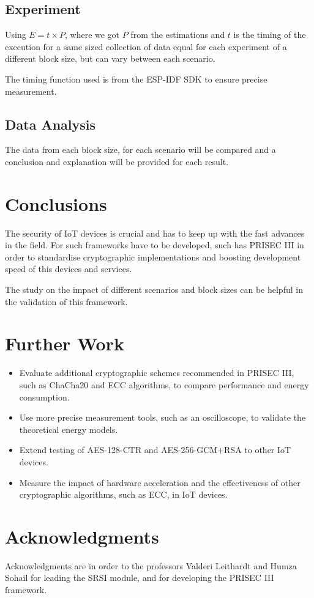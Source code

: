 \documentclass[METI_NISS]{IEEEtran}
\begin{document}
\subsection{Experiment}
Using $E = t \times P$, where we got $P$ from the estimations and $t$ is the timing of the execution for a same sized collection of data equal for each experiment of a different block size, but can vary between each scenario. 

The timing function used is from the ESP-IDF SDK to ensure precise measurement.

\subsection{Data Analysis}
The data from each block size, for each scenario will be compared and a conclusion and explanation will be provided for each result.

\section{Conclusions}
The security of IoT devices is crucial and has to keep up with the fast advances in the field. For such frameworks have to be developed, such has PRISEC III in order to standardise cryptographic implementations and boosting development speed of this devices and services. 

The study on the impact of different scenarios and block sizes can be helpful in the validation of this framework.


\section{Further Work}
\begin{itemize}
    \item Evaluate additional cryptographic schemes recommended in PRISEC III, such as ChaCha20 and ECC algorithms, to compare performance and energy consumption.
    \item Use more precise measurement tools, such as an oscilloscope, to validate the theoretical energy models.
    \item Extend testing of AES-128-CTR and AES-256-GCM+RSA to other IoT devices.
    \item Measure the impact of hardware acceleration and the effectiveness of other cryptographic algorithms, such as ECC, in IoT devices.
\end{itemize}

\section{Acknowledgments}
Acknowledgments are in order to the professors Valderi Leithardt and Humza Sohail for leading the SRSI module, and for developing the PRISEC III framework.
\end{document}
